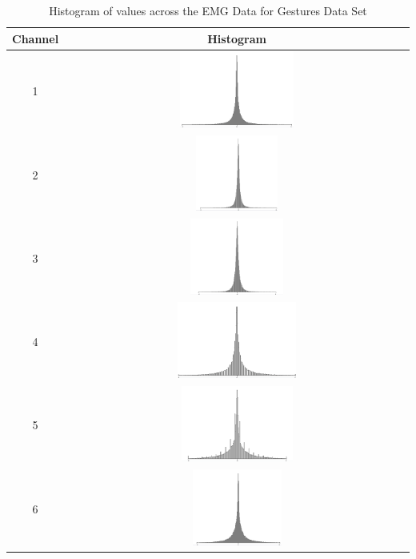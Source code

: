 \documentclass[11pt]{article}
\begin{document}
	\begin{table}[H]
		\centering		
		\caption{Histogram of values across the EMG Data for Gestures Data Set}
		\label{tbl:histo}
		\begin{tabular}{cc}
			\toprule
			Channel & Histogram\\
			\midrule
			1 & \includegraphics[height=2.5cm, width=12cm]{Figures/Stats/channel1}\\
			2 & \includegraphics[height=2.5cm, width=12cm]{Figures/Stats/channel2}\\
			3 & \includegraphics[height=2.5cm, width=12cm]{Figures/Stats/channel3}\\
			4 & \includegraphics[height=2.5cm, width=12cm]{Figures/Stats/channel4}\\
			5 & \includegraphics[height=2.5cm, width=12cm]{Figures/Stats/channel5}\\
			6 & \includegraphics[height=2.5cm, width=12cm]{Figures/Stats/channel6}\\

\end{tabular}
\end{table}
\end{document}
